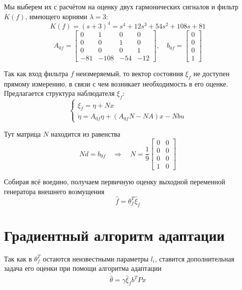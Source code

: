 \documentclass[a4paper,hidelinks,14pt]{extarticle}
\begin{document}
	Мы выберем их с расчётом на оценку двух гармонических сигналов и фильтр $K(f)$, имеющего корнями $\lambda = 3$:
	\[
		K(f) = (s+3)^4 = s^4 + 12 s^3 + 54s^2 +108s + 81
	\]
	\[
	A_{0f} = \begin{bmatrix}
			0 & 1 & 0 & 0 \\
			0 & 0 & 1 & 0 \\
			0 & 0 & 0 & 1 \\
			-81 & -108 & -54 & -12
		\end{bmatrix}, \quad b_{0f} = \begin{bmatrix}
			0 \\
			0 \\
			0 \\
			1
		\end{bmatrix}
	\]
	
	Так как вход фильтра $f$ неизмеряемый, то вектор состояния $\xi_f$ не доступен прямому измерению, в связи с чем возникает необходимость в его оценке. Предлагается структура наблюдателя $\xi_f$:
	\begin{equation}
		\begin{cases*}
			\hat{\xi}_f = \eta + Nx \\
			\dot{\eta} = A_{0f} \eta + (A_{0f} N - NA)x - Nbu	
		\end{cases*}
	\end{equation}
	
	Тут матрица $N$ находится из равенства
	\[
		Nd = b_{0f} \quad \Rightarrow \quad N = \frac{1}{9}\begin{bmatrix}
			0 & 0 \\
			0 & 0 \\
			0 & 0 \\
			1 & 0
		\end{bmatrix}
	\]

	Собирая всё воедино, получаем первичную оценку выходной переменной генератора внешнего возмущения
	\begin{equation}
		\hat{f} = \theta^T_f \hat{\xi}_f
	\end{equation}

	\section{Градиентный алгоритм адаптации}
	Так как в $\theta_f^T$ остаются неизвестными параметры $l_i$, ставится дополнительная задача его оценки при помощи алгоритма адаптации
	\begin{equation}
		\dot{\hat{\theta}} = \gamma \hat{\xi}_f b^T P x
	\end{equation}
\end{document}
